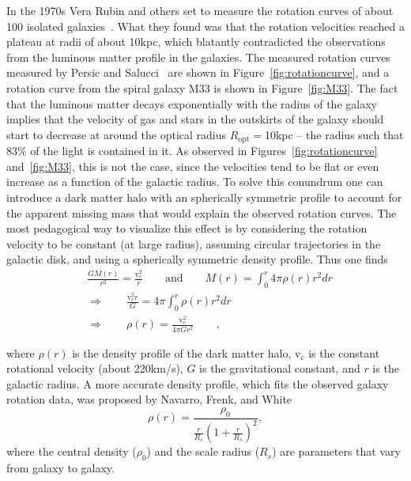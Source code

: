  In the 1970s Vera Rubin and others
set to measure the rotation curves of about 100 isolated
galaxies~\cite{rubin}. What they found was that the rotation
velocities reached a plateau at radii of about 10\unit{kpc}, which
blatantly contradicted the observations from the luminous matter
profile in the galaxies. The measured rotation curves measured by
Persic and Salucci~\cite{PandS} are shown in Figure~\ref{fig:rotationcurve}, and a
rotation curve from the spiral galaxy M33 is shown in
Figure~\ref{fig:M33}. The fact that the luminous matter decays
exponentially with the radius of the galaxy implies that  the velocity
of gas and stars in the outskirts of the galaxy should start to
decrease at around the optical radius $R_{\mathrm{opt}} = $10\unit{kpc} -- the radius
such that 83\% of the light is contained in it. As observed in
Figures~\ref{fig:rotationcurve} and~\ref{fig:M33}, this is not the case, since the
velocities tend to be flat or even increase as a function of the
galactic radius. To solve this conundrum one can introduce a dark
matter halo with an spherically symmetric profile to account for the
apparent missing mass that would explain the observed rotation
curves. The most pedagogical way to visualize this effect is by
considering the rotation velocity to be constant (at large radius),
assuming  circular trajectories in the galactic disk, and using a
spherically symmetric density profile. Thus one finds
\begin{equation}
\label{eq:densityProfile}
\begin{aligned}
       &\frac{GM(r)}{r^{2}} = \frac{\mathrm{v}^{2}_{c}}{r} 
        \qquad \text{and}  \qquad  M(r) = \int^{r}_{0} 4\pi \rho(r) r^{2}dr\\
        & 
        \Rightarrow \qquad \frac{\mathrm{v}^{2}_{c}r}{G} = 4\pi
        \int^{r}_{0} \rho(r) r^{2}dr \qquad \text{}\\
        & \Rightarrow \qquad \rho(r) = \frac{\mathrm{v}^{2}_{c}}{4\pi
          G r^{2}}\qquad \text{},
       \end{aligned}
\end{equation}

where $\rho(r)$ is the density profile of the dark matter halo,
$\mathrm{v}_{c}$ is the constant rotational velocity (about
220\unit{km/s}), $G$ is the gravitational constant, and $r$ is the
galactic radius. A more accurate density profile, which fits the
observed galaxy rotation data, was proposed by Navarro, Frenk, and
White~\cite{NFW}
\begin{equation}
\rho(r) = \frac{\rho_{0}}{\frac{r}{R_{s}}\left( 1+\frac{r}{R_{s}}\right)^{2}},
\label{eq:NFW}
\end{equation}
where the central density ($\rho_{0}$) and the scale radius ($R_{s}$)
are parameters that vary from galaxy to galaxy.

